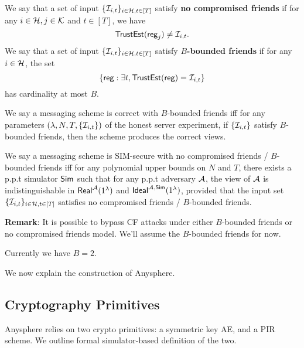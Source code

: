 \begin{definition}
We say that a set of input $\{\mathcal{I}_{i, t}\}_{i \in \mathcal{H}, t \in [T]}$ satisfy \textbf{no compromised friends} if for any $i \in \mathcal{H}, j \in \mathcal{K}$ and $t \in [T]$, we have
$$\mathsf{TrustEst}(\mathsf{reg}_j) \neq \mathcal{I}_{i, t}.$$
We say that a set of input $\{\mathcal{I}_{i, t}\}_{i \in \mathcal{H}, t \in [T]}$ satisfy \textbf{$B$-bounded friends} if for any $i \in \mathcal{H}$, the set
$$\{\mathsf{reg}: \exists t, \mathsf{TrustEst}(\mathsf{reg}) = \mathcal{I}_{i, t}\}$$
has cardinality at most $B$.

We say a messaging scheme is correct with $B$-bounded friends iff for any parameters $(\lambda, N, T, \{\mathcal{I}_{i, t}\})$ of the honest server experiment, if $\{\mathcal{I}_{i, t}\}$ satisfy $B$-bounded friends, then the scheme produces the correct views.

We say a messaging scheme is SIM-secure with no compromised friends / $B$-bounded friends iff for any polynomial upper bounds on $N$ and $T$, there exists a p.p.t simulator $\mathsf{Sim}$ such that for any p.p.t adversary $\mathcal{A}$, the view of $\mathcal{A}$ is indistinguishable in $\mathsf{Real}^{\mathcal{A}}(1^{\lambda})$ and $\mathsf{Ideal}^{\mathcal{A}, \mathsf{\mathsf{Sim}}}(1^{\lambda})$, provided that the input set $\{\mathcal{I}_{i, t}\}_{i \in \mathcal{H}, t \in [T]}$ satisfies no compromised friends / $B$-bounded friends.
\end{definition}
\textbf{Remark}: It is possible to bypass CF attacks under either $B$-bounded friends or no compromised friends model. We'll assume the $B$-bounded friends for now.

Currently we have $B = 2$.

We now explain the construction of Anysphere. 
\subsection{Cryptography Primitives}
Anysphere relies on two crypto primitives: a symmetric key AE, and a PIR scheme. We outline formal simulator-based definition of the two.
